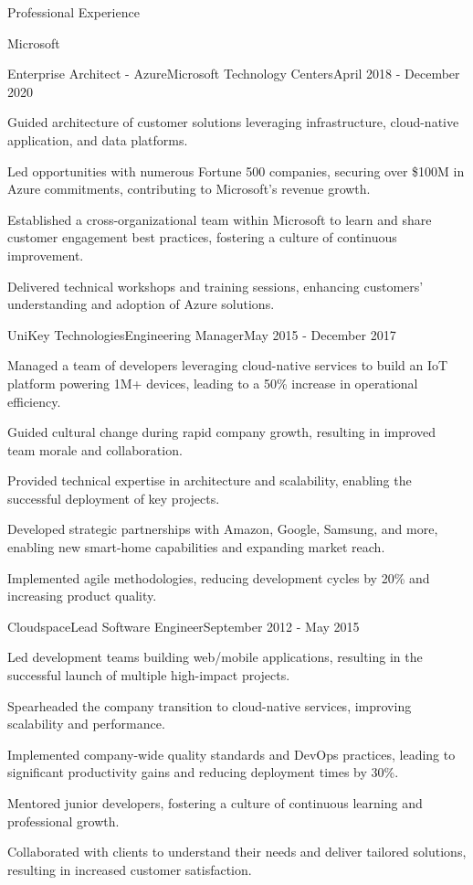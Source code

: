 \documentclass{resume} %
\begin{document}
\begin{rSection}{Professional Experience}
\begin{rCompany}{Microsoft}{}{}
    \begin{rSubSubsection}{Enterprise Architect - Azure}{Microsoft Technology Centers}{April 2018 - December 2020}
        \item Guided architecture of customer solutions leveraging infrastructure, cloud-native application, and data platforms.
        \item Led opportunities with numerous Fortune 500 companies, securing over \$100M in Azure commitments, contributing to Microsoft's revenue growth.
        \item Established a cross-organizational team within Microsoft to learn and share customer engagement best practices, fostering a culture of continuous improvement.
        \item Delivered technical workshops and training sessions, enhancing customers' understanding and adoption of Azure solutions.
    \end{rSubSubsection}
  \end{rCompany}

  \begin{rNewRole}{UniKey Technologies}{Engineering Manager}{May 2015 - December 2017}
    \item Managed a team of developers leveraging cloud-native services to build an IoT platform powering 1M+ devices, leading to a 50\% increase in operational efficiency.
    \item Guided cultural change during rapid company growth, resulting in improved team morale and collaboration.
    \item Provided technical expertise in architecture and scalability, enabling the successful deployment of key projects.
    \item Developed strategic partnerships with Amazon, Google, Samsung, and more, enabling new smart-home capabilities and expanding market reach.
    \item Implemented agile methodologies, reducing development cycles by 20\% and increasing product quality.
  \end{rNewRole}

  \begin{rNewRole}{Cloudspace}{Lead Software Engineer}{September 2012 - May 2015}
    \item Led development teams building web/mobile applications, resulting in the successful launch of multiple high-impact projects.
    \item Spearheaded the company transition to cloud-native services, improving scalability and performance.
    \item Implemented company-wide quality standards and DevOps practices, leading to significant productivity gains and reducing deployment times by 30\%.
    \item Mentored junior developers, fostering a culture of continuous learning and professional growth.
    \item Collaborated with clients to understand their needs and deliver tailored solutions, resulting in increased customer satisfaction.
  \end{rNewRole}
  

\end{rSection}
\end{document}
